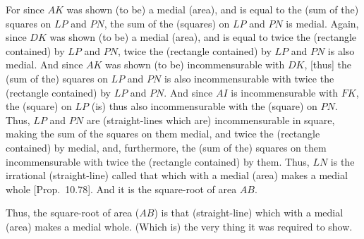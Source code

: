 \begin{Parallel}{}{}
{For since $AK$ was shown (to be) a medial (area), and is equal to the
(sum of the) squares on $LP$ and $PN$, the sum of the (squares) on
$LP$ and $PN$ is medial. Again, since $DK$ was shown (to
be) a medial (area), and is equal to twice the (rectangle contained)
by $LP$ and $PN$, twice the (rectangle contained) by $LP$ and
$PN$ is also medial. And since $AK$ was shown (to be) incommensurable
with $DK$, [thus] the (sum of the) squares on $LP$ and $PN$ is also
incommensurable with twice the (rectangle contained) by $LP$ and $PN$.
And since $AI$ is incommensurable with $FK$, the (square) on
$LP$ (is) thus also incommensurable with the (square) on $PN$. Thus, $LP$ and $PN$
are (straight-lines which are) incommensurable in square, making the sum of the squares on them
medial, and twice the (rectangle contained) by  medial, and, furthermore,
the (sum of the) squares on them incommensurable with twice the
(rectangle contained) by them. Thus, $LN$ is the irrational (straight-line) called  that  which with a medial (area) makes a medial whole [Prop.~10.78]. And it is the square-root of area $AB$.

Thus, the square-root of area ($AB$) is that (straight-line) which with a medial (area) makes a medial whole. (Which is) the very thing it was required to show.}
\end{Parallel}

